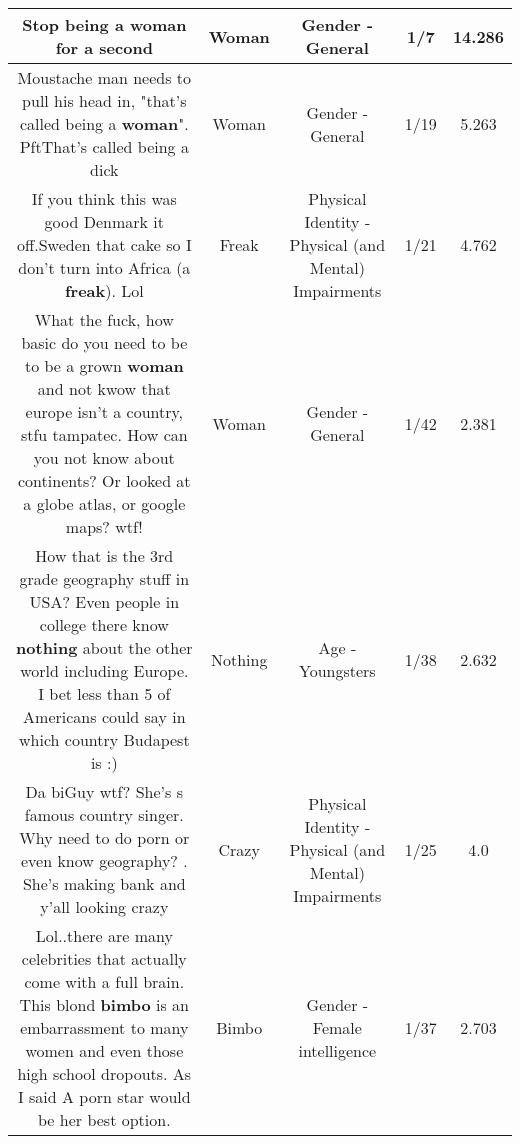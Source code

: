 \documentclass[11pt]{article}
\newlength\mylength
\begin{document}
\begin{center}
\begin{longtable}{|C{.65\mylength}|C{.30\mylength}|C{.12\mylength}|C{.12\mylength}|C{.12\mylength}|}
  \small Stop being a \textbf{woman} for a second\normalsize   & Woman & Gender - General & 1/7 & 14.286 \\  \hline
  \small Moustache man needs to pull his head in, "that's called being a \textbf{woman}". PftThat's called being a dick\normalsize   & Woman & Gender - General & 1/19 & 5.263 \\  \hline
  \small If you think this was good Denmark it off.Sweden that cake so I don't turn into Africa (a \textbf{freak}). Lol\normalsize   & Freak & Physical Identity - Physical (and Mental) Impairments & 1/21 & 4.762 \\  \hline
  \small What the fuck, how basic do you need to be to be a grown \textbf{woman} and not kwow that europe isn't a country, stfu tampatec. How can you not know about continents? Or looked at a globe atlas, or google maps? wtf!\normalsize   & Woman & Gender - General & 1/42 & 2.381 \\  \hline
  \small How that is the 3rd grade geography stuff in USA? Even people in college there know \textbf{nothing} about the other world including Europe. I bet less than 5 of Americans could say in which country Budapest is :)\normalsize   & Nothing & Age - Youngsters & 1/38 & 2.632 \\  \hline
  \small Da biGuy wtf? She's s famous country singer. Why need to do porn or even know geography? . She's making bank and y'all looking crazy\normalsize   & Crazy & Physical Identity - Physical (and Mental) Impairments & 1/25 & 4.0 \\  \hline
  \small Lol..there are many celebrities that actually come with a full brain. This blond \textbf{bimbo} is an embarrassment to many women and even those high school dropouts. As I said A  porn star would be her best option.\normalsize   & Bimbo & Gender - Female intelligence & 1/37 & 2.703 \\  \hline

\end{longtable}
\end{center}
\end{document}
